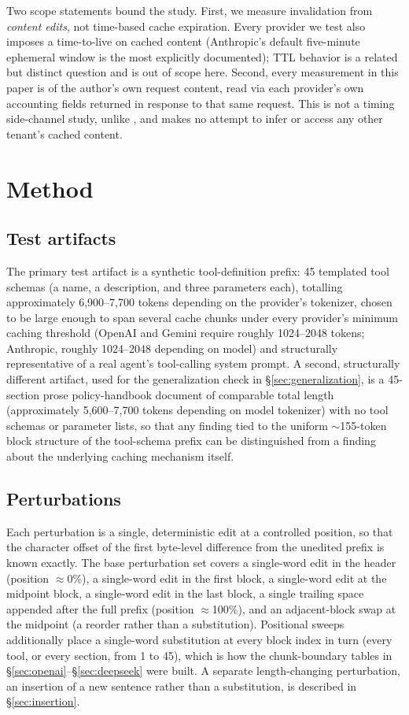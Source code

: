 \documentclass[11pt]{article}
\begin{document}
Two scope statements bound the study. First, we measure invalidation from
\emph{content edits}, not time-based cache expiration. Every provider we
test also imposes a time-to-live on cached content (Anthropic's default
five-minute ephemeral window is the most explicitly documented); TTL
behavior is a related but distinct question and is out of scope here.
Second, every measurement in this paper is of the author's own request
content, read via each provider's own accounting fields returned in response
to that same request. This is not a timing side-channel study, unlike
\citet{prompt-cache-audit}, and makes no attempt to infer or access any other
tenant's cached content.

\section{Method}
\label{sec:method}

\subsection{Test artifacts}
The primary test artifact is a synthetic tool-definition prefix: 45
templated tool schemas (a name, a description, and three parameters each),
totalling approximately 6,900--7,700 tokens depending on the provider's
tokenizer, chosen to be large enough to span
several cache chunks under every provider's minimum caching threshold
(OpenAI and Gemini require roughly 1024--2048 tokens; Anthropic, roughly
1024--2048 depending on model) and structurally representative of a real
agent's tool-calling system prompt. A second, structurally different
artifact, used for the generalization check in \S\ref{sec:generalization},
is a 45-section prose policy-handbook document of comparable total length
(approximately 5,600--7,700 tokens depending on model tokenizer) with no
tool schemas or parameter lists, so that any finding tied to the uniform
$\sim$155-token block structure of the tool-schema prefix can be
distinguished from a finding about the underlying caching mechanism itself.

\subsection{Perturbations}
Each perturbation is a single, deterministic edit at a controlled position,
so that the character offset of the first byte-level difference from the
unedited prefix is known exactly. The base perturbation set covers a
single-word edit in the header (position $\approx$0\%), a single-word edit
in the first block, a single-word edit at the midpoint block, a single-word
edit in the last block, a single trailing space appended after the full
prefix (position $\approx$100\%), and an adjacent-block swap at the midpoint
(a reorder rather than a substitution). Positional sweeps additionally place
a single-word substitution at every block index in turn (every tool, or
every section, from 1 to 45), which is how the chunk-boundary tables in
\S\ref{sec:openai}--\S\ref{sec:deepseek} were built. A separate
length-changing perturbation, an insertion of a new sentence rather than a
substitution, is described in \S\ref{sec:insertion}.
\end{document}
